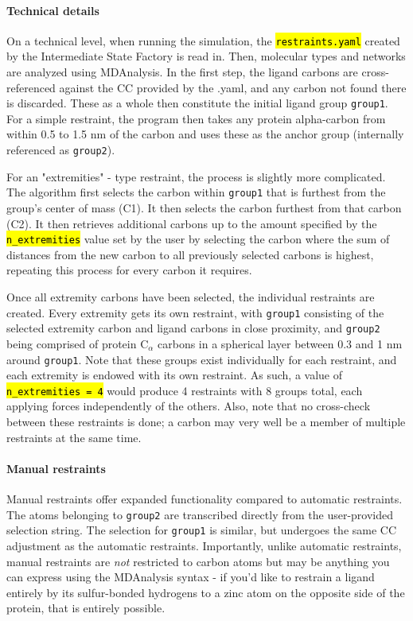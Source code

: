 \documentclass[oneside]{scrreprt}
\newcommand{\code}[1]{\texttt{\hl{#1}}}
\begin{document}
\paragraph{Technical details}
\begin{sloppypar}
On a technical level, when running the simulation, the \code{restraints.yaml} created by the Intermediate State Factory is read in. Then, molecular types and networks are analyzed using MDAnalysis. In the first step, the ligand carbons are cross-referenced against the CC provided by the .yaml, and any carbon not found there is discarded. These as a whole then constitute the initial ligand group \texttt{group1}. For a simple restraint, the program then takes any protein alpha-carbon from within 0.5 to 1.5 nm of the carbon and uses these as the anchor group (internally referenced as \texttt{group2}).
\end{sloppypar}

For an "extremities" - type restraint, the process is slightly more complicated. The algorithm first selects the carbon within \texttt{group1} that is furthest from the group's center of mass (C1). It then selects the carbon furthest from that carbon (C2). It then retrieves additional carbons up to the amount specified by the \code{n\_extremities} value set by the user by selecting the carbon where the sum of distances from the new carbon to all previously selected carbons is highest, repeating this process for every carbon it requires.

Once all extremity carbons have been selected, the individual restraints are created. Every extremity gets its own restraint, with \texttt{group1} consisting of the selected extremity carbon and ligand carbons in close proximity, and \texttt{group2} being comprised of protein C$_\alpha$ carbons in a spherical layer between 0.3 and 1 nm around \texttt{group1}. Note that these groups exist individually for each restraint, and each extremity is endowed with its own restraint. As such, a value of \code{n\_extremities = 4} would produce 4 restraints with 8 groups total, each applying forces independently of the others. Also, note that no cross-check between these restraints is done; a carbon may very well be a member of multiple restraints at the same time.

\paragraph{Manual restraints}
Manual restraints offer expanded functionality compared to automatic restraints. The atoms belonging to \texttt{group2} are transcribed directly from the user-provided selection string. The selection for \texttt{group1} is similar, but undergoes the same CC adjustment as the automatic restraints. Importantly, unlike automatic restraints, manual restraints are \textit{not} restricted to carbon atoms but may be anything you can express using the MDAnalysis syntax - if you'd like to restrain a ligand entirely by its sulfur-bonded hydrogens to a zinc atom on the opposite side of the protein, that is entirely possible.
\end{document}
